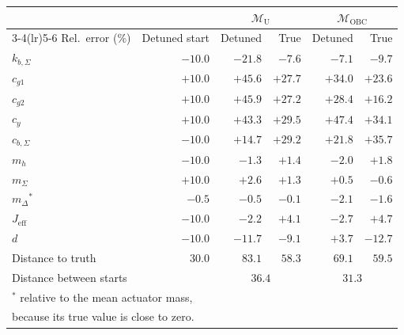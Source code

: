 \setlength{\tabcolsep}{2.7pt}
\begin{tabular}{l r r r r r}
\toprule
 & & \multicolumn{2}{c}{$\mathcal{M}_{\mathrm{U}}$} & \multicolumn{2}{c}{$\mathcal{M}_{\mathrm{OBC}}$}\\
\cmidrule(lr){3-4}\cmidrule(lr){5-6}
Rel.\ error (\%) & Detuned start & Detuned & True & Detuned & True\\
\midrule
$k_{b,\Sigma}$ & $-10.0$ & $-21.8$ & $-7.6$ & $-7.1$ & $-9.7$\\
\midrule
$c_{g1}$ & $+10.0$ & $+45.6$ & $+27.7$ & $+34.0$ & $+23.6$\\
$c_{g2}$ & $+10.0$ & $+45.9$ & $+27.2$ & $+28.4$ & $+16.2$\\
$c_y$ & $+10.0$ & $+43.3$ & $+29.5$ & $+47.4$ & $+34.1$\\
$c_{b,\Sigma}$ & $-10.0$ & $+14.7$ & $+29.2$ & $+21.8$ & $+35.7$\\
\midrule
$m_h$ & $-10.0$ & $-1.3$ & $+1.4$ & $-2.0$ & $+1.8$\\
$m_\Sigma$ & $+10.0$ & $+2.6$ & $+1.3$ & $+0.5$ & $-0.6$\\
$m_\Delta$$^*$ & $-0.5$ & $-0.5$ & $-0.1$ & $-2.1$ & $-1.6$\\
$J_{\mathrm{eff}}$ & $-10.0$ & $-2.2$ & $+4.1$ & $-2.7$ & $+4.7$\\
\midrule
$d$ & $-10.0$ & $-11.7$ & $-9.1$ & $+3.7$ & $-12.7$\\
\midrule
Distance to truth & $30.0$ & $83.1$ & $58.3$ & $69.1$ & $59.5$\\
Distance between starts &  & \multicolumn{2}{c}{$36.4$} & \multicolumn{2}{c}{$31.3$}\\
\bottomrule
\multicolumn{6}{l}{\footnotesize $^*$ relative to the mean actuator mass,}\\
\multicolumn{6}{l}{\footnotesize because its true value is close to zero.}\\
\end{tabular}
